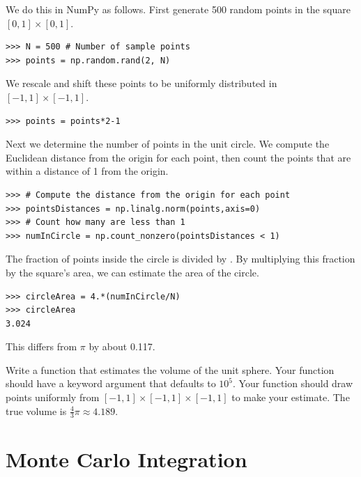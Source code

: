 We do this in NumPy as follows. First generate 500 random points in the square $[0,1] \times [0,1]$.
\begin{lstlisting}
>>> N = 500 # Number of sample points
>>> points = np.random.rand(2, N)
\end{lstlisting}
We rescale and shift these points to be uniformly distributed in $[-1,1]\times[-1,1]$.
\begin{lstlisting}
>>> points = points*2-1
\end{lstlisting}
Next we determine the number of points in the unit circle.
We compute the Euclidean distance from the origin for each point, then count the points that are within a distance of 1 from the origin.
\begin{lstlisting}
>>> # Compute the distance from the origin for each point
>>> pointsDistances = np.linalg.norm(points,axis=0)
>>> # Count how many are less than 1
>>> numInCircle = np.count_nonzero(pointsDistances < 1)
\end{lstlisting}
The fraction of points inside the circle is  divided by . By multiplying this fraction by the square's area, we can estimate the area of the circle.
\begin{lstlisting}
>>> circleArea = 4.*(numInCircle/N)
>>> circleArea
3.024
\end{lstlisting}
This differs from $\pi$ by about 0.117.

\begin{problem}
\label{prob:sphere}
Write a function that estimates the volume of the unit sphere. Your function should have a keyword argument  that defaults to $10^5$. Your function should draw  points uniformly from $[-1,1]\times[-1,1]\times[-1,1]$ to make your estimate. The true volume is $\frac{4}{3}\pi \approx 4.189$.
\end{problem}


\section*{Monte Carlo Integration} %

